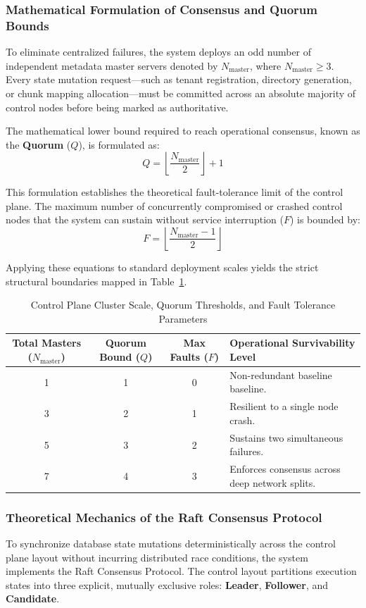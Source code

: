 \subsubsection{Mathematical Formulation of Consensus and Quorum Bounds}
To eliminate centralized failures, the system deploys an odd number of independent metadata master servers denoted by $N_{\text{master}}$, where $N_{\text{master}} \ge 3$. Every state mutation request---such as tenant registration, directory generation, or chunk mapping allocation---must be committed across an absolute majority of control nodes before being marked as authoritative. 

The mathematical lower bound required to reach operational consensus, known as the \textbf{Quorum} ($Q$), is formulated as:
$$Q = \left\lfloor \frac{N_{\text{master}}}{2} \right\rfloor + 1$$

This formulation establishes the theoretical fault-tolerance limit of the control plane. The maximum number of concurrently compromised or crashed control nodes that the system can sustain without service interruption ($F$) is bounded by:
$$F = \left\lfloor \frac{N_{\text{master}} - 1}{2} \right\rfloor$$

Applying these equations to standard deployment scales yields the strict structural boundaries mapped in Table~\ref{tab:quorum_bounds}.

\begin{table}[htbp]
\small
\centering
\caption{Control Plane Cluster Scale, Quorum Thresholds, and Fault Tolerance Parameters}
\label{tab:quorum_bounds}
\vspace{2mm}
\begin{tabular}{|c|c|c|l|}
\hline
\textbf{Total Masters ($N_{\text{master}}$)} & \textbf{Quorum Bound ($Q$)} & \textbf{Max Faults ($F$)} & \textbf{Operational Survivability Level} \\ \hline
1 & 1 & 0 & Non-redundant baseline baseline. \\ \hline
3 & 2 & 1 & Resilient to a single node crash. \\ \hline
5 & 3 & 2 & Sustains two simultaneous failures. \\ \hline
7 & 4 & 3 & Enforces consensus across deep network splits. \\ \hline
\end{tabular}
\end{table}

\subsubsection{Theoretical Mechanics of the Raft Consensus Protocol}
To synchronize database state mutations deterministically across the control plane layout without incurring distributed race conditions, the system implements the Raft Consensus Protocol. The control layout partitions execution states into three explicit, mutually exclusive roles: \textbf{Leader}, \textbf{Follower}, and \textbf{Candidate}.

